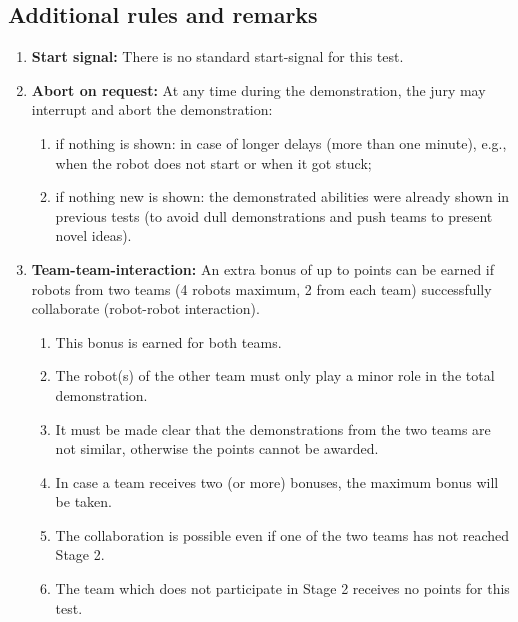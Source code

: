 \subsection{Additional rules and remarks}
\begin{enumerate}
	\item \textbf{Start signal:} There is no standard start-signal for this test.
	\item \textbf{Abort on request:} At any time during the demonstration, the jury may interrupt and abort the demonstration:
	\begin{enumerate}
		\item if nothing is shown: in case of longer delays (more than one minute), e.g., when the robot does not start or when it got stuck;
		\item if nothing new is shown: the demonstrated abilities were already shown in previous tests (to avoid dull demonstrations and push teams to present novel ideas).
	\end{enumerate}

	\item \textbf{Team-team-interaction:}  An extra bonus of up to \bonusRobotCoop points can be earned if robots from two teams (4 robots maximum, 2 from each team) successfully collaborate (robot-robot interaction).
	\begin{enumerate}
		\item This bonus is earned for both teams.
		\item The robot(s) of the other team must only play a minor role in the total demonstration.
		\item It must be made clear that the demonstrations from the two teams are not similar, otherwise the points cannot be awarded.
		\item In case a team receives two (or more) bonuses, the maximum bonus will be taken.
		\item The collaboration is possible even if one of the two teams has not reached Stage 2.
		\item The team which does not participate in Stage 2 receives no points for this test.
	\end{enumerate}
\end{enumerate}


